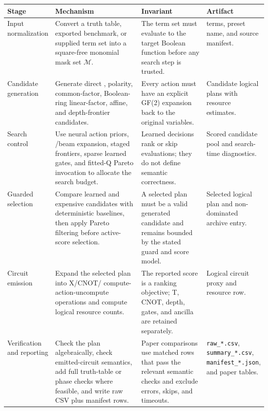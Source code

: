 \begin{tabularx}{\linewidth}{>{\raggedright\arraybackslash}p{0.17\linewidth}>{\raggedright\arraybackslash}X>{\raggedright\arraybackslash}p{0.25\linewidth}>{\raggedright\arraybackslash}p{0.20\linewidth}}
\toprule
Stage & Mechanism & Invariant & Artifact \\
\midrule
Input normalization & Convert a truth table, exported benchmark, or supplied term set into a square-free \anf{} monomial mask set $\mathcal{M}$. & The term set must evaluate to the target Boolean function before any search step is trusted. & \anf{} terms, preset name, and source manifest. \\
Candidate generation & Generate direct \anf{}, \fprm{} polarity, common-factor, Boolean-ring linear-factor, affine, and depth-frontier candidates. & Every action must have an explicit GF(2) expansion back to the original variables. & Candidate logical plans with resource estimates. \\
Search control & Use neural action priors, \mcts{}/beam expansion, staged frontiers, sparse learned gates, and fitted-Q Pareto invocation to allocate the search budget. & Learned decisions rank or skip evaluations; they do not define semantic correctness. & Scored candidate pool and search-time diagnostics. \\
Guarded selection & Compare learned and expensive candidates with deterministic baselines, then apply Pareto filtering before active-score selection. & A selected plan must be a valid generated candidate and remains bounded by the stated guard and score model. & Selected logical plan and non-dominated archive entry. \\
Circuit emission & Expand the selected plan into X/CNOT/\mct{} compute-action-uncompute operations and compute logical resource counts. & The reported score is a ranking objective; T, CNOT, depth, gates, and ancilla are retained separately. & Logical circuit proxy and resource row. \\
Verification and reporting & Check the plan algebraically, check emitted-circuit \anf{} semantics, add full truth-table or phase checks where feasible, and write raw CSV plus manifest rows. & Paper comparisons use matched rows that pass the relevant semantic checks and exclude errors, skips, and timeouts. & \texttt{raw\_*.csv}, \texttt{summary\_*.csv}, \texttt{manifest\_*.json}, and paper tables. \\
\bottomrule
\end{tabularx}
